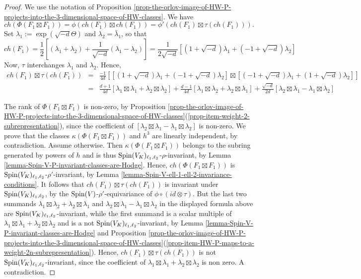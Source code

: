 \documentclass[12pt]{amsart}
\numberwithin{equation}{subsection}
\theoremstyle{plain}
\theoremstyle{definition}
\newcommand{\Spin}{{\rm Spin}}
\begin{document}
\begin{proof}
We use the notation of Proposition \ref{prop-the-orlov-image-of-HW-P-projects-into-the-3-dimensional-space-of-HW-classes}.
We have 
\[
ch(\Phi(F_1\boxtimes F_1))=
\phi(ch(F_1)\boxtimes ch(F_1))=\phi'(ch(F_1)\boxtimes \tau(ch(F_1))).
\]
Set $\lambda_1:=\exp(\sqrt{-d}\Theta)$ and $\lambda_2=\bar{\lambda}_1$, so that 
\[
ch(F_1)=\frac{1}{2}\left[
(\lambda_1+\lambda_2)+\frac{1}{\sqrt{-d}}(\lambda_1-\lambda_2)
\right]=
\frac{1}{2\sqrt{-d}}\left[(1+\sqrt{-d})\lambda_1+(-1+\sqrt{-d})\lambda_2\right]
\]
Now, $\tau$ interchanges $\lambda_1$ and $\lambda_2$. Hence,
\begin{eqnarray*}
ch(F_1)\!\boxtimes\! \tau(ch(F_1))
\!&=&\!
\frac{-1}{4d}\!\left[
[
(1\!\!+\!\!\sqrt{-d})\lambda_1\!+\!(-1\!\!+\!\!\sqrt{-d})\lambda_2
]
\boxtimes
[
(-1\!\!+\!\!\sqrt{-d})\lambda_1\!+\!(1\!\!+\!\!\sqrt{-d})\lambda_2
]
\right]
\\
\!&=&\!
\frac{d\!+\!1}{4d}[\lambda_1\!\!\boxtimes\!\!\lambda_1\!+\!\lambda_2\!\!\boxtimes\!\!\lambda_2]
\!+\!
\frac{d\!-\!1}{4d}[\lambda_1\!\!\boxtimes\!\!\lambda_2\!+\!\lambda_2\!\!\boxtimes\!\!\lambda_1]
\!+\!
\frac{\sqrt{-d}}{2d}[\lambda_2\!\!\boxtimes\!\!\lambda_1\!-\!\lambda_1\!\!\boxtimes\!\!\lambda_2]
\end{eqnarray*}

The rank of $\Phi(F_1\boxtimes F_1)$ is non-zero, by Proposition \ref{prop-the-orlov-image-of-HW-P-projects-into-the-3-dimensional-space-of-HW-classes}(\ref{prop-item-weight-2-subrepresentation}),
since the coefficient of $[\lambda_2\!\!\boxtimes\!\!\lambda_1\!-\!\lambda_1\!\!\boxtimes\!\!\lambda_2]$ is non-zero. 
We prove that the classes 
$\kappa(\Phi(F_1\boxtimes F_1))$ and $h^3$ are linearly independent, by contradiction. Assume otherwise. Then $\kappa(\Phi(F_1\boxtimes F_1))$
belongs to the subring generated by powers of $h$ and is thus $\Spin(V_K)_{\ell_1,\ell_2}$-$\rho$-invariant, by Lemma \ref{lemma-Spin-V-P-invariant-classes-are-Hodge}. Hence, $ch(\Phi(F_1\boxtimes F_1))$ is $\Spin(V_K)_{\ell_1,\ell_2}$-$\rho'$-invariant, by Lemma \ref{lemma-Spin-V-ell-1-ell-2-invariance-conditions}.
It follows that $ch(F_1)\boxtimes\tau(ch(F_1))$ is invariant under $\Spin(V_K)_{\ell_1,\ell_2}$, by the $\Spin(V)$-$\rho'$-equivariance of $\phi\circ(id\otimes\tau).$
But the last two summands 
$\lambda_1\!\!\boxtimes\!\!\lambda_2\!+\!\lambda_2\!\!\boxtimes\!\!\lambda_1$ and 
$\lambda_2\!\!\boxtimes\!\!\lambda_1\!-\!\lambda_1\!\!\boxtimes\!\!\lambda_2$
in the displayed formula above are $\Spin(V_K)_{\ell_1,\ell_2}$-invariant, while the first summand is a scalar multiple of $\lambda_1\!\!\boxtimes\!\!\lambda_1\!+\!\lambda_2\!\!\boxtimes\!\!\lambda_2$ and is a not $\Spin(V_K)_{\ell_1,\ell_2}$-invariant, by Lemma \ref{lemma-Spin-V-P-invariant-classes-are-Hodge} and Proposition \ref{prop-the-orlov-image-of-HW-P-projects-into-the-3-dimensional-space-of-HW-classes}(\ref{prop-item-HW-P-maps-to-a-weight-2n-subrepresentation}).
Hence, $ch(F_1)\boxtimes\tau(ch(F_1))$ is not $\Spin(V_K)_{\ell_1,\ell_2}$-invariant, 
since the coefficient of $\lambda_1\!\!\boxtimes\!\!\lambda_1\!+\!\lambda_2\!\!\boxtimes\!\!\lambda_2$ is non zero. A contradiction.
\end{proof}
\end{document}
